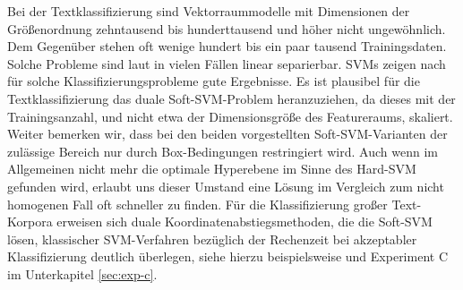 Bei der Textklassifizierung sind Vektorraummodelle mit Dimensionen der Größenordnung zehntausend bis hunderttausend und höher nicht ungewöhnlich. Dem Gegenüber stehen oft wenige hundert bis ein paar tausend Trainingsdaten. Solche Probleme sind laut \cite{j-tcsvmmf} in vielen Fällen linear separierbar. SVMs zeigen nach \cite{j-tcsvmmf} für solche Klassifizierungsprobleme gute Ergebnisse. Es ist plausibel für die Textklassifizierung das duale Soft-SVM-Problem heranzuziehen, da dieses mit der Trainingsanzahl, und nicht etwa der Dimensionsgröße des Featureraums, skaliert. Weiter bemerken wir, dass bei den beiden vorgestellten Soft-SVM-Varianten der zulässige Bereich nur durch Box-Bedingungen restringiert wird. Auch wenn im Allgemeinen nicht mehr die optimale Hyperebene im Sinne des Hard-SVM gefunden wird, erlaubt uns dieser Umstand eine Lösung im Vergleich zum nicht homogenen Fall oft schneller zu finden. Für die Klassifizierung großer Text-Korpora erweisen sich duale Koordinatenabstiegsmethoden, die die Soft-SVM lösen, klassischer SVM-Verfahren bezüglich der Rechenzeit bei akzeptabler Klassifizierung deutlich überlegen, siehe hierzu beispielsweise \cite{hcl-pgsvc-16} und Experiment C im Unterkapitel \ref{sec:exp-c}.
